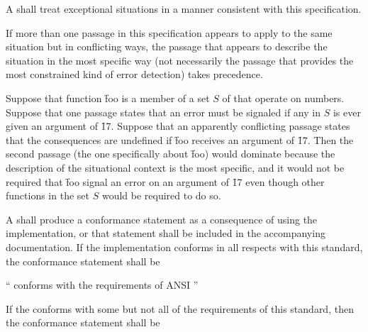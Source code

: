 
A  shall treat exceptional situations 
in a manner consistent with this specification.
 

If more than one passage in this specification appears to apply to the
same situation but in conflicting ways, the passage that appears
to describe the situation in the most specific way (not necessarily the
passage that provides the most constrained kind of error detection) 
takes precedence.


Suppose that function \f{foo} is a member of a set $S$ of  that
operate on numbers.  Suppose that one passage states that an error must be
signaled if any  in $S$ is ever given an argument of \f{17}.
Suppose that an apparently conflicting passage states that the consequences 
are undefined if \f{foo} receives an argument of \f{17}.  Then the second passage
(the one specifically about \f{foo}) would dominate because the description of
the situational context is the most specific, and it would not be required that
\f{foo} signal an error on an argument of \f{17} even though other functions in 
the set $S$ would be required to do so.

\endsubsubsubsubsection%

\endsubsubsubsection%

\endsubsubsection%


A  shall produce a conformance statement 
as a consequence of using the implementation, or that statement
shall be included in the accompanying documentation.  If the implementation
conforms in all respects with this standard, the conformance statement
shall be
 
\beginlist
\item{} `` conforms with the requirements 
	  of ANSI ''
\endlist
 
If the  conforms with some but not all of the requirements of this
standard, then the conformance statement shall be
 
